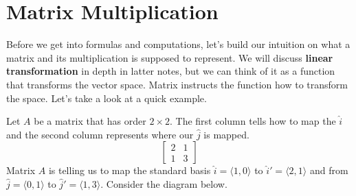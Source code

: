 \documentclass[../../main.tex]{subfiles}
\begin{document}
\section{Matrix Multiplication}

Before we get into formulas and computations, let's build our
intuition on what a matrix and its multiplication is supposed to
represent. We will discuss \textbf{linear transformation} in
depth in latter notes, but we can think of it as a function that
transforms the vector space. Matrix instructs the function how to
transform the space. Let's take a look at a quick example.

Let $A$ be a matrix that has order $2 \times 2$. The first column
tells how to map the $\hat{i}$ and the second column represents
where our $\hat{j}$ is mapped.
\[
\begin{bmatrix}
    2 & 1 \\
    1 & 3
\end{bmatrix}
\]
Matrix $A$ is telling us to map the standard basis $\hat{i} =
\langle 1, 0 \rangle$ to $\hat{i}'= \langle 2, 1 \rangle$ and from
$\hat{j} = \langle 0, 1 \rangle$ to $\hat{j}' = \langle 1, 3 \rangle$.
Consider the diagram below.
\end{document}
